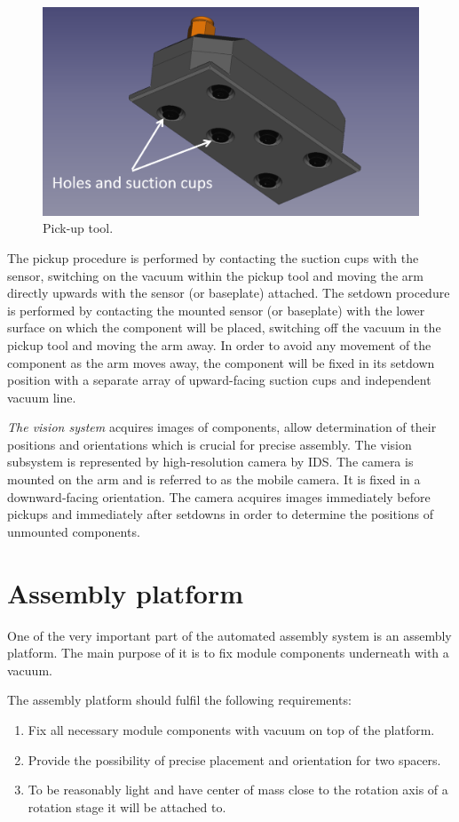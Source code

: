 \begin{figure}[ht]\centering
\includegraphics[width=0.7\linewidth]{Data/Module_assembly/Pick_up_tool.png}
\caption{Pick-up tool.}
\label{fig:pick_up_tool}
\end{figure}

The pickup procedure is performed by contacting the suction cups with the sensor, switching on the vacuum within the pickup tool and moving the arm directly upwards with the sensor (or baseplate) attached. The setdown procedure is performed by contacting the mounted sensor (or baseplate) with the lower surface on which the component will be placed, switching off the vacuum in the pickup tool and moving the arm away. In order to avoid any movement of the component as the arm moves away, the component will be fixed in its setdown position with a separate array of upward-facing suction cups and independent vacuum line.

\emph{The vision system} acquires images of components, allow determination of their positions and orientations which is crucial for precise assembly. The vision subsystem is represented by high-resolution camera by IDS. The camera is mounted on the arm and is referred to as the mobile camera. It is fixed in a downward-facing orientation. The camera acquires images immediately before pickups and immediately after setdowns in order to determine the positions of unmounted components. 

\section{Assembly platform}

One of the very important part of the automated assembly system is an assembly platform. The main purpose of it is to fix module components underneath with a vacuum.

The assembly platform should fulfil the following requirements:

\begin{enumerate}
\setlength\itemsep{-0.5em}
\item Fix all necessary module components with vacuum on top of the platform.
\item Provide the possibility of precise placement and orientation for two spacers.
\item To be reasonably light and have center of mass close to the rotation axis of a rotation stage it will be attached to.
\end{enumerate}

